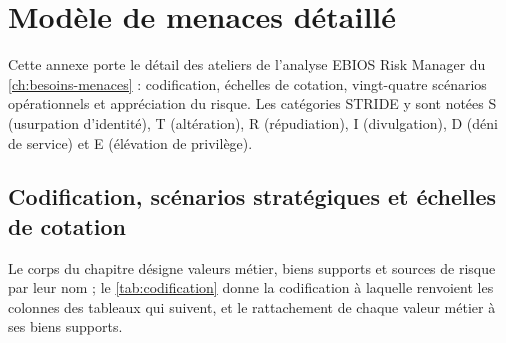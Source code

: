 \chapter{Modèle de menaces détaillé}
\label{ann:modele-menaces}

Cette annexe porte le détail des ateliers de l'analyse EBIOS Risk Manager du \cref{ch:besoins-menaces} :
codification, échelles de cotation, vingt-quatre scénarios opérationnels et appréciation du
risque. Les catégories STRIDE y sont notées S (usurpation d'identité), T (altération), R
(répudiation), I (divulgation), D (déni de service) et E (élévation de privilège).

\section{Codification, scénarios stratégiques et échelles de cotation}

Le corps du chapitre désigne valeurs métier, biens supports et sources de risque par leur nom ;
le \cref{tab:codification} donne la codification à laquelle renvoient les colonnes des
tableaux qui suivent, et le rattachement de chaque valeur métier à ses biens supports.

